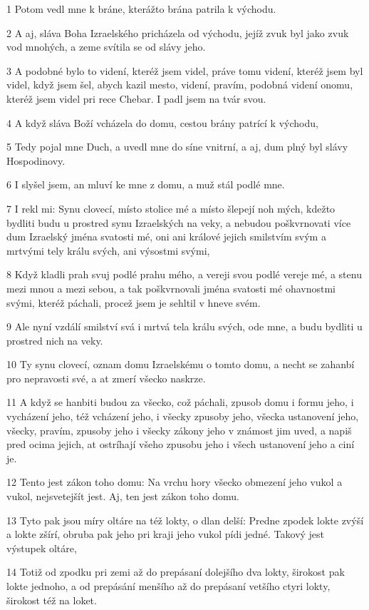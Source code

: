 \par 1 Potom vedl mne k bráne, kterážto brána patrila k východu.
\par 2 A aj, sláva Boha Izraelského pricházela od východu, jejíž zvuk byl jako zvuk vod mnohých, a zeme svítila se od slávy jeho.
\par 3 A podobné bylo to videní, kteréž jsem videl, práve tomu videní, kteréž jsem byl videl, když jsem šel, abych kazil mesto, videní, pravím, podobná videní onomu, kteréž jsem videl pri rece Chebar. I padl jsem na tvár svou.
\par 4 A když sláva Boží vcházela do domu, cestou brány patrící k východu,
\par 5 Tedy pojal mne Duch, a uvedl mne do síne vnitrní, a aj, dum plný byl slávy Hospodinovy.
\par 6 I slyšel jsem, an mluví ke mne z domu, a muž stál podlé mne.
\par 7 I rekl mi: Synu clovecí, místo stolice mé a místo šlepejí noh mých, kdežto bydliti budu u prostred synu Izraelských na veky, a nebudou poškvrnovati více dum Izraelský jména svatosti mé, oni ani králové jejich smilstvím svým a mrtvými tely králu svých, ani výsostmi svými,
\par 8 Když kladli prah svuj podlé prahu mého, a vereji svou podlé vereje mé, a stenu mezi mnou a mezi sebou, a tak poškvrnovali jména svatosti mé ohavnostmi svými, kteréž páchali, procež jsem je sehltil v hneve svém.
\par 9 Ale nyní vzdálí smilství svá i mrtvá tela králu svých, ode mne, a budu bydliti u prostred nich na veky.
\par 10 Ty synu clovecí, oznam domu Izraelskému o tomto domu, a necht se zahanbí pro nepravosti své, a at zmerí všecko naskrze.
\par 11 A když se hanbiti budou za všecko, což páchali, zpusob domu i formu jeho, i vycházení jeho, též vcházení jeho, i všecky zpusoby jeho, všecka ustanovení jeho, všecky, pravím, zpusoby jeho i všecky zákony jeho v známost jim uved, a napiš pred ocima jejich, at ostríhají všeho zpusobu jeho i všech ustanovení jeho a ciní je.
\par 12 Tento jest zákon toho domu: Na vrchu hory všecko obmezení jeho vukol a vukol, nejsvetejšít jest. Aj, ten jest zákon toho domu.
\par 13 Tyto pak jsou míry oltáre na též lokty, o dlan delší: Predne zpodek lokte zvýší a lokte zšírí, obruba pak jeho pri kraji jeho vukol pídi jedné. Takový jest výstupek oltáre,
\par 14 Totiž od zpodku pri zemi až do prepásaní dolejšího dva lokty, širokost pak lokte jednoho, a od prepásání menšího až do prepásaní vetšího ctyri lokty, širokost též na loket.
